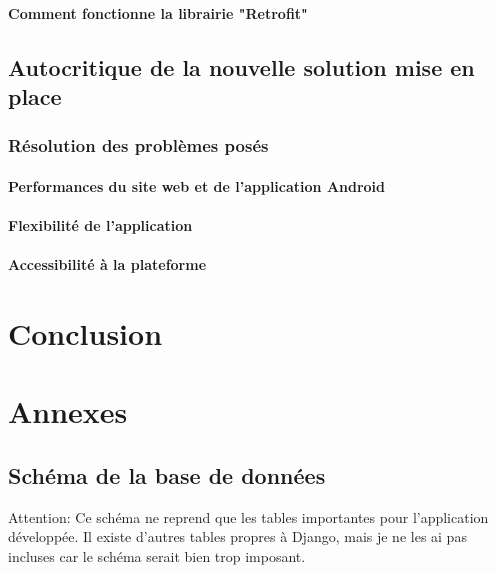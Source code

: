 \documentclass[12pt,table,a4paper]{report}
\begin{document}
\subsubsection{Comment fonctionne la librairie "Retrofit"}
\todo{}

\section{Autocritique de la nouvelle solution mise en place}
\subsection{Résolution des problèmes posés}
\subsubsection{Performances du site web et de l'application Android}
\subsubsection{Flexibilité de l'application}
\subsubsection{Accessibilité à la plateforme}

\chapter{Conclusion}

\chapter{Annexes}


\section{Schéma de la base de données}
Attention: Ce schéma ne reprend que les tables importantes pour l'application développée. Il existe d'autres tables propres à Django, mais je ne les ai pas incluses car le schéma serait bien trop imposant.
\end{document}
